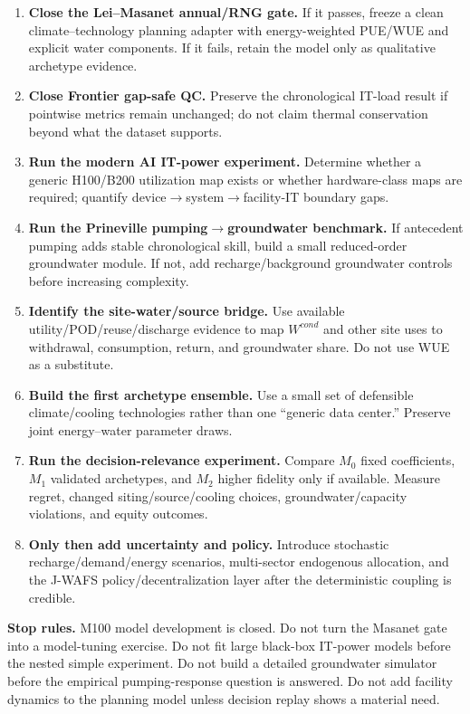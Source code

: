 \documentclass[11pt]{article}
\begin{document}
\begin{enumerate}
\item \textbf{Close the Lei--Masanet annual/RNG gate.} If it passes, freeze a clean climate--technology planning adapter with energy-weighted PUE/WUE and explicit water components. If it fails, retain the model only as qualitative archetype evidence.
\item \textbf{Close Frontier gap-safe QC.} Preserve the chronological IT-load result if pointwise metrics remain unchanged; do not claim thermal conservation beyond what the dataset supports.
\item \textbf{Run the modern AI IT-power experiment.} Determine whether a generic H100/B200 utilization map exists or whether hardware-class maps are required; quantify device$\rightarrow$system$\rightarrow$facility-IT boundary gaps.
\item \textbf{Run the Prineville pumping$\rightarrow$groundwater benchmark.} If antecedent pumping adds stable chronological skill, build a small reduced-order groundwater module. If not, add recharge/background groundwater controls before increasing complexity.
\item \textbf{Identify the site-water/source bridge.} Use available utility/POD/reuse/discharge evidence to map $W^{cond}$ and other site uses to withdrawal, consumption, return, and groundwater share. Do not use WUE as a substitute.
\item \textbf{Build the first archetype ensemble.} Use a small set of defensible climate/cooling technologies rather than one ``generic data center.'' Preserve joint energy--water parameter draws.
\item \textbf{Run the decision-relevance experiment.} Compare $M_0$ fixed coefficients, $M_1$ validated archetypes, and $M_2$ higher fidelity only if available. Measure regret, changed siting/source/cooling choices, groundwater/capacity violations, and equity outcomes.
\item \textbf{Only then add uncertainty and policy.} Introduce stochastic recharge/demand/energy scenarios, multi-sector endogenous allocation, and the J-WAFS policy/decentralization layer after the deterministic coupling is credible.
\end{enumerate}

\textbf{Stop rules.} M100 model development is closed. Do not turn the Masanet gate into a model-tuning exercise. Do not fit large black-box IT-power models before the nested simple experiment. Do not build a detailed groundwater simulator before the empirical pumping-response question is answered. Do not add facility dynamics to the planning model unless decision replay shows a material need.
\end{document}
